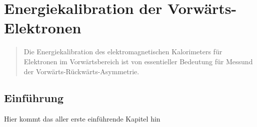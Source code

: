 


%
\chapter{Energiekalibration der Vorwärts-Elektronen}

\begin{quote}
    Die Energiekalibration des elektromagnetischen Kalorimeters für Elektronen im Vorwärtsbereich ist von essentieller
    Bedeutung für Messund der Vorwärts-Rückwärts-Asymmetrie.
\end{quote}


\section{Einführung}
Hier kommt das aller erste einführende Kapitel hin \cite{fitzgerald:realigning_research_and_practice}

